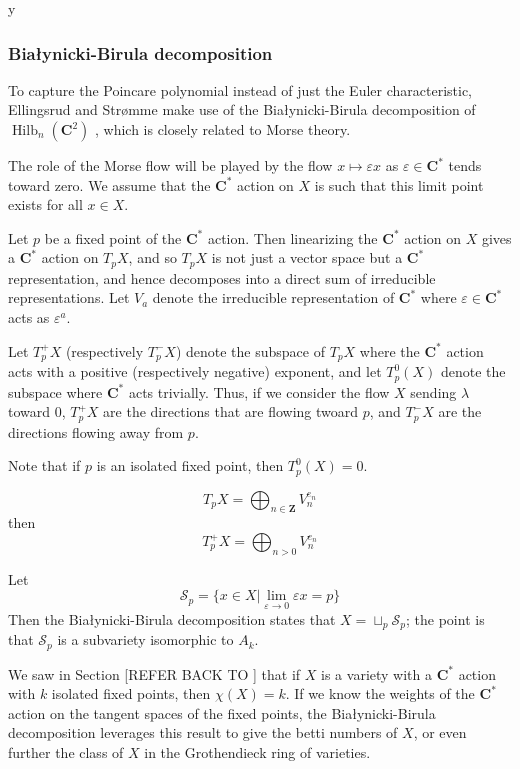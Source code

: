 y\documentclass{amsart}[12pt]
\theoremstyle{definition}
\newcommand{\Z}{\mathbf{Z}}
\newcommand{\C}{\mathbf{C}}
\DeclareMathOperator{\Hilb}{Hilb}
\begin{document}
\subsubsection{Bia\l ynicki-Birula decomposition}

To capture the Poincare polynomial instead of just the Euler characteristic, Ellingsrud and Str\o mme make use of the Bia\l ynicki-Birula decomposition of $\Hilb_n(\C^2)$ \cite{BB}, which is closely related to Morse theory. 




The role of the Morse flow will be played by the flow $x\mapsto \varepsilon x$ as $\varepsilon\in\C^*$ tends toward zero.  We assume that the $\C^*$ action on $X$ is such that this limit point exists for all $x\in X$.  

Let $p$ be a fixed point of the $\C^*$ action.  Then linearizing the $\C^*$ action on $X$ gives a $\C^*$ action on $T_pX$, and so $T_pX$ is not just a vector space but a $\C^*$ representation, and hence decomposes into a direct sum of irreducible representations.  Let $V_a$ denote the irreducible representation of $\C^*$ where $\varepsilon\in\C^*$ acts as $\varepsilon^a$.  


Let $T_p^+X$ (respectively $T_p^-X$) denote the subspace of $T_pX$ where the $\C^*$ action acts with a positive (respectively negative) exponent, and let $T_p^0(X)$ denote the subspace where $\C^*$ acts trivially.  Thus, if we consider the flow $X$ sending $\lambda$ toward 0, $T_p^+X$ are the directions that are flowing twoard $p$, and $T_p^-X$ are the directions flowing away from $p$.  

Note that if $p$ is an isolated fixed point, then $T_p^0(X)=0$.

$$T_pX=\bigoplus_{n\in\Z} V_n^{e_n}$$
then
$$T_p^+X=\bigoplus_{n>0} V_n^{e_n}$$

Let 
$$\mathcal{S}_p=\{x\in X|\lim_{\varepsilon\to 0} \varepsilon x=p\}$$
Then the Bia\l ynicki-Birula decomposition states that $X=\sqcup_{p}\mathcal{S}_p$; the point is that $\mathcal{S}_p$ is a subvariety isomorphic to $A_k$.





We saw in Section [REFER BACK TO ] that if $X$ is a variety with a $\C^*$ action with $k$ isolated fixed points, then $\chi(X)=k$.  If we know the weights of the $\C^*$ action on the tangent spaces of the fixed points, the Bia\l ynicki-Birula decomposition leverages this result to give the betti numbers of $X$, or even further the class of $X$ in the Grothendieck ring of varieties.
\end{document}

